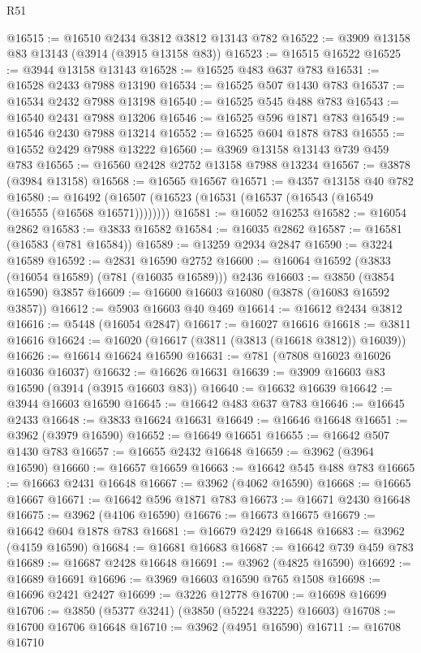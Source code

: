 \begin{lexlean}{R51}
\begin{coremodule}
@16515 := @16510 @2434 @3812 @3812 @13143 @782
@16522 := @3909 @13158 @83 @13143 (@3914 (@3915 @13158 @83))
@16523 := @16515 @16522
@16525 := @3944 @13158 @13143
@16528 := @16525 @483 @637 @783
@16531 := @16528 @2433 @7988 @13190
@16534 := @16525 @507 @1430 @783
@16537 := @16534 @2432 @7988 @13198
@16540 := @16525 @545 @488 @783
@16543 := @16540 @2431 @7988 @13206
@16546 := @16525 @596 @1871 @783
@16549 := @16546 @2430 @7988 @13214
@16552 := @16525 @604 @1878 @783
@16555 := @16552 @2429 @7988 @13222
@16560 := @3969 @13158 @13143 @739 @459 @783
@16565 := @16560 @2428 @2752 @13158 @7988 @13234
@16567 := @3878 (@3984 @13158)
@16568 := @16565 @16567
@16571 := @4357 @13158 @40 @782
@16580 := @16492 (@16507 (@16523 (@16531 (@16537 (@16543 (@16549 (@16555 (@16568 @16571))))))))
@16581 := @16052 @16253
@16582 := @16054 @2862
@16583 := @3833 @16582
@16584 := @16035 @2862
@16587 := @16581 (@16583 (@781 @16584))
@16589 := @13259 @2934 @2847
@16590 := @3224 @16589
@16592 := @2831 @16590 @2752
@16600 := @16064 @16592 (@3833 (@16054 @16589) (@781 (@16035 @16589))) @2436
@16603 := @3850 (@3854 @16590) @3857
@16609 := @16600 @16603 @16080 (@3878 (@16083 @16592 @3857))
@16612 := @5903 @16603 @40 @469
@16614 := @16612 @2434 @3812
@16616 := @5448 (@16054 @2847)
@16617 := @16027 @16616
@16618 := @3811 @16616
@16624 := @16020 (@16617 (@3811 (@3813 (@16618 @3812)) @16039))
@16626 := @16614 @16624 @16590
@16631 := @781 (@7808 @16023 @16026 @16036 @16037)
@16632 := @16626 @16631
@16639 := @3909 @16603 @83 @16590 (@3914 (@3915 @16603 @83))
@16640 := @16632 @16639
@16642 := @3944 @16603 @16590
@16645 := @16642 @483 @637 @783
@16646 := @16645 @2433
@16648 := @3833 @16624 @16631
@16649 := @16646 @16648
@16651 := @3962 (@3979 @16590)
@16652 := @16649 @16651
@16655 := @16642 @507 @1430 @783
@16657 := @16655 @2432 @16648
@16659 := @3962 (@3964 @16590)
@16660 := @16657 @16659
@16663 := @16642 @545 @488 @783
@16665 := @16663 @2431 @16648
@16667 := @3962 (@4062 @16590)
@16668 := @16665 @16667
@16671 := @16642 @596 @1871 @783
@16673 := @16671 @2430 @16648
@16675 := @3962 (@4106 @16590)
@16676 := @16673 @16675
@16679 := @16642 @604 @1878 @783
@16681 := @16679 @2429 @16648
@16683 := @3962 (@4159 @16590)
@16684 := @16681 @16683
@16687 := @16642 @739 @459 @783
@16689 := @16687 @2428 @16648
@16691 := @3962 (@4825 @16590)
@16692 := @16689 @16691
@16696 := @3969 @16603 @16590 @765 @1508
@16698 := @16696 @2421 @2427
@16699 := @3226 @12778
@16700 := @16698 @16699
@16706 := @3850 (@5377 @3241) (@3850 (@5224 @3225) @16603)
@16708 := @16700 @16706 @16648
@16710 := @3962 (@4951 @16590)
@16711 := @16708 @16710

\end{coremodule}
\end{lexlean}
